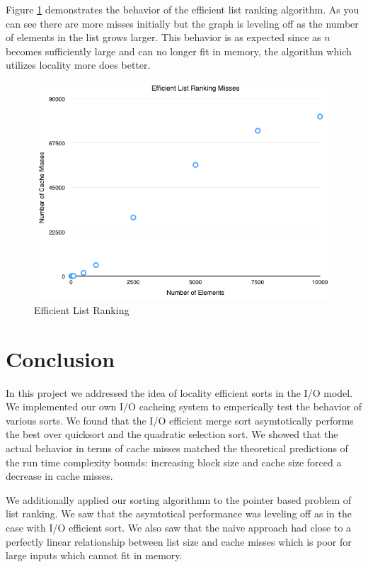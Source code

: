 \documentclass[11pt]{article}
\begin{document}
Figure \ref{efficientlistranking}  demonstrates the behavior of the efficient list ranking algorithm. As you can see there are more misses initially but the graph is leveling off as the number of elements in the list grows larger.  This behavior is 
as expected since as $n$ becomes sufficiently large and can no longer fit in memory, the algorithm which utilizes locality more does better.

\begin{figure}[H]  
\includegraphics[scale=0.5]{figures/EfficientListRanking.png}
\caption{Efficient List Ranking}
\label{efficientlistranking}
\end{figure}

\section{Conclusion}
In this project we addressed the idea of locality efficient sorts in the I/O model.  We implemented our own I/O cacheing system to 
emperically test the behavior of various sorts.   We found that the I/O efficient merge sort asymtotically performs the best over quicksort 
and the quadratic selection sort.  We showed that the actual behavior in terms of cache misses matched the theoretical predictions of the 
run time complexity bounds: increasing block size and cache size forced a decrease in cache misses.

We additionally applied our sorting algorithmn to the pointer based problem of list ranking.  We saw that 
the asymtotical performance was leveling off as in the case with I/O efficient sort.  We also saw that the naive approach had close to a 
perfectly linear relationship between list size and cache misses which is poor for large inputs which cannot fit in memory.
\end{document}
